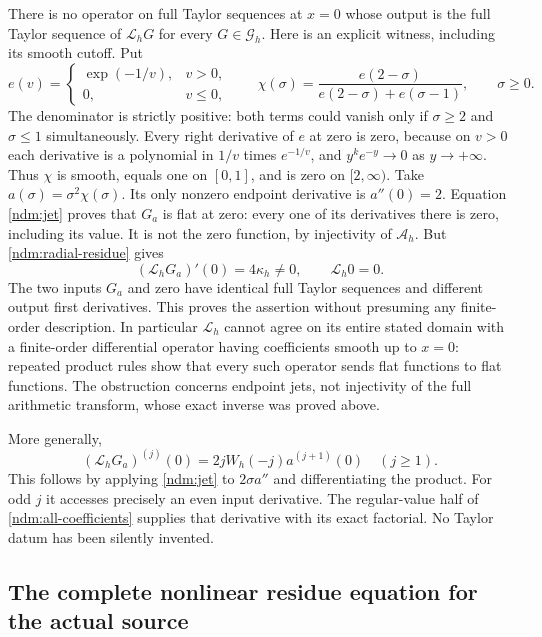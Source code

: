 There is no operator on full Taylor sequences at \(x=0\) whose
output is the full Taylor sequence of \(\mathscr L_hG\) for every
\(G\in\mathcal G_h\). Here is an explicit witness, including its
smooth cutoff. Put
\[
 e(v)=
 \begin{cases}\exp(-1/v),&v>0,\\0,&v\le0,\end{cases}
 \qquad
 \chi(\sigma)=
 \frac{e(2-\sigma)}{e(2-\sigma)+e(\sigma-1)},\qquad \sigma\ge0.
\]
The denominator is strictly positive: both terms could vanish only
if \(\sigma\ge2\) and \(\sigma\le1\) simultaneously.
Every right derivative of \(e\) at zero is zero, because on \(v>0\)
each derivative is a polynomial in \(1/v\) times \(e^{-1/v}\), and
\(y^ke^{-y}\to0\) as \(y\to+\infty\). Thus \(\chi\) is smooth,
equals one on \([0,1]\), and is zero on \([2,\infty)\).
Take \(a(\sigma)=\sigma^2\chi(\sigma)\).
Its only nonzero endpoint derivative is \(a''(0)=2\).
Equation \eqref{ndm:jet} proves that \(G_a\) is flat at zero:
every one of its derivatives there is zero, including its value.
It is not the zero function, by injectivity of \(\mathcal A_h\).
But \eqref{ndm:radial-residue} gives
\[
 (\mathscr L_hG_a)'(0)=4\kappa_h\ne0,\qquad
 \mathscr L_h0=0.
\]
The two inputs \(G_a\) and zero have identical full Taylor sequences
and different output first derivatives. This proves the assertion
without presuming any finite-order description.
In particular \(\mathscr L_h\) cannot agree on its entire stated
domain with a finite-order differential operator having coefficients
smooth up to \(x=0\): repeated product rules show that every such
operator sends flat functions to flat functions.
The obstruction concerns endpoint jets, not injectivity of the
full arithmetic transform, whose exact inverse was proved above.

More generally,
\[
 (\mathscr L_hG_a)^{(j)}(0)
      =2jW_h(-j)a^{(j+1)}(0)\quad(j\ge1).
\]
This follows by applying \eqref{ndm:jet} to \(2\sigma a''\)
and differentiating the product. For odd \(j\) it accesses precisely
an even input derivative. The regular-value half of
\eqref{ndm:all-coefficients} supplies that derivative with its exact
factorial. No Taylor datum has been silently invented.

\subsection{The complete nonlinear residue equation for the actual source}

